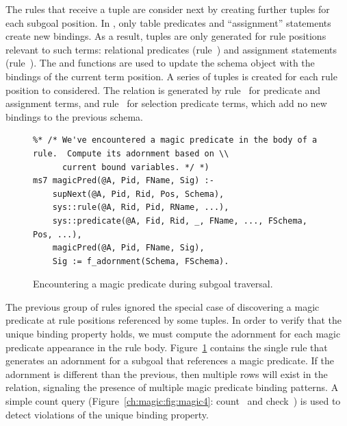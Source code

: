 The rules that receive a  tuple are consider next by creating further
 tuples for each subgoal position.  In \OVERLOG, only table predicates
and ``assignment'' statements create new bindings.  As a result, 
tuples are only generated for rule positions relevant to such terms: relational
predicates (rule~) and assignment statements (rule~).  The
 and  functions are used to update the schema
object with the bindings of the current term position.  A series of
 tuples is created for each rule position to considered.  The
 relation is generated by rule~ for predicate and
assignment terms, and rule~ for selection predicate terms, which add no
new bindings to the previous schema.


\begin{figure}
\ssp
\centering
\begin{lstlisting}
%* /* We've encountered a magic predicate in the body of a rule.  Compute its adornment based on \\
      current bound variables. */ *)
ms7 magicPred(@A, Pid, FName, Sig) :-
    supNext(@A, Pid, Rid, Pos, Schema),
    sys::rule(@A, Rid, Pid, RName, ...),
    sys::predicate(@A, Fid, Rid, _, FName, ..., FSchema, Pos, ...),
    magicPred(@A, Pid, FName, Sig),
    Sig := f_adornment(Schema, FSchema).
\end{lstlisting}
\caption{\label{ch:magic:fig:magic3}Encountering a magic predicate during subgoal traversal.}
\end{figure}

The previous group of rules ignored the special case of discovering a magic
predicate at rule positions referenced by some  tuples.  In order
to verify that the unique binding property holds, we must compute the adornment
for each magic predicate appearance in the rule body.
Figure~\ref{ch:magic:fig:magic3} contains the single rule that generates an
adornment for a subgoal that references a magic predicate.  If the adornment is
different than the previous, then multiple rows will exist in the
 relation, signaling the presence of multiple magic predicate
binding patterns.  A simple count query (Figure~\ref{ch:magic:fig:magic4}:
count~ and check~) is used to detect violations of the unique
binding property.

